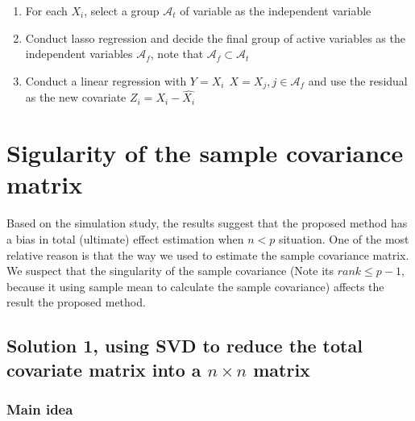 \documentclass[]{article}
\providecommand{\tightlist}{%
  \setlength{\itemsep}{0pt}\setlength{\parskip}{0pt}}
\begin{document}
\begin{enumerate}
\def\labelenumi{\arabic{enumi}.}
\tightlist
\item
  For each \(X_i\), select a group \(\mathcal{A}_t\) of variable as the
  independent variable
\item
  Conduct lasso regression and decide the final group of active
  variables as the independent variables \(\mathcal{A}_f\), note that
  \(\mathcal{A}_f \subset \mathcal{A}_t\)
\item
  Conduct a linear regression with
  \(Y = X_i ~~ X = X_j, j\in\mathcal{A}_f\) and use the residual as the
  new covariate \(Z_i = X_i - \hat{X_i}\)
\end{enumerate}

\section{Sigularity of the sample covariance
matrix}\label{sigularity-of-the-sample-covariance-matrix}

Based on the simulation study, the results suggest that the proposed
method has a bias in total (ultimate) effect estimation when \(n<p\)
situation. One of the most relative reason is that the way we used to
estimate the sample covariance matrix. We suspect that the singularity
of the sample covariance (Note its \(rank \leq p-1\), because it using
sample mean to calculate the sample covariance) affects the result the
proposed method.

\subsection{\texorpdfstring{Solution 1, using SVD to reduce the total
covariate matrix into a \(n \times n\)
matrix}{Solution 1, using SVD to reduce the total covariate matrix into a n \textbackslash{}times n matrix}}\label{solution-1-using-svd-to-reduce-the-total-covariate-matrix-into-a-n-times-n-matrix}

\subsubsection{Main idea}\label{main-idea}
\end{document}
